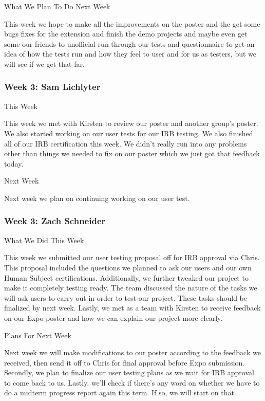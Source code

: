 What We Plan To Do Next Week



This week we hope to make all the improvements on the poster and the get some bugs fixes for the extension and finish the demo projects and maybe even get some our friends to unofficial run through our tests and questionnaire to get an idea of how the tests run and how they feel to user and for us as testers, but we will see if we get that far. \\ 

 \subsubsection{Week 3: Sam Lichlyter}

This Week

This week we met with Kirsten to review our poster and another group's poster. We also started working on our user tests for our IRB testing. We also finished all of our IRB certification this week. We didn't really run into any problems other than things we needed to fix on our poster which we just got that feedback today. 



Next Week

Next week we plan on continuing working on our user test. \\ 

 \subsubsection{Week 3: Zach Schneider}

What We Did This Week

This week we submitted our user testing proposal off for IRB approval via Chris. This proposal included the questions we planned to ask our users and our own Human Subject certifications. Additionally, we further tweaked our project to make it completely testing ready. The team discussed the nature of the tasks we will ask users to carry out in order to test our project. These tasks should be finalized by next week. Lastly, we met as a team with Kirsten to receive feedback on our Expo poster and how we can explain our project more clearly.



Plans For Next Week

Next week we will make modifications to our poster according to the feedback we received, then send it off to Chris for final approval before Expo submission. Secondly, we plan to finalize our user testing plans as we wait for IRB approval to come back to us. Lastly, we'll check if there's any word on whether we have to do a midterm progress report again this term. If so, we will start on that. \\ 

